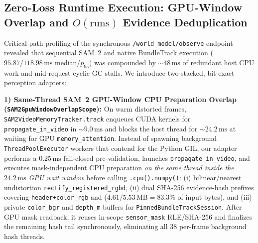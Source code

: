 \documentclass[10pt,journal]{IEEEtran}
\begin{document}
\subsection{Zero-Loss Runtime Execution: GPU-Window Overlap and $O(\text{runs})$ Evidence Deduplication}
\label{sec:runtime_opt}
Critical-path profiling of the synchronous \texttt{/world\_model/observe} endpoint revealed that sequential SAM~2 and native BundleTrack execution ($95.87/118.98\,\mathrm{ms}$ median/$p_{95}$) was compounded by $\sim 48\,\mathrm{ms}$ of redundant host CPU work and mid-request cyclic GC stalls. We introduce two stacked, bit-exact perception adapters:

\textbf{1) Same-Thread SAM~2 GPU-Window CPU Preparation Overlap (\texttt{SAM2GpuWindowOverlapScope}):} On warm distorted frames, \texttt{SAM2VideoMemoryTracker.track} enqueues CUDA kernels for \texttt{propagate\_in\_video} in $\sim 9.0\,\mathrm{ms}$ and blocks the host thread for $\sim 24.2\,\mathrm{ms}$ at  waiting for GPU \texttt{memory\_attention}. Instead of spawning background \texttt{ThreadPoolExecutor} workers that contend for the Python GIL, our adapter performs a $0.25\,\mathrm{ms}$ fail-closed pre-validation, launches \texttt{propagate\_in\_video}, and executes mask-independent CPU preparation \emph{on the same thread inside the $24.2\,\mathrm{ms}$ GPU wait window} before calling \texttt{.cpu().numpy()}: (i) bilinear/nearest undistortion \texttt{rectify\_registered\_rgbd}, (ii) dual SHA-256 evidence-hash prefixes covering \texttt{header+color\_rgb} and  ($4.61/5.53\,\mathrm{MB}=83.3\%$ of input bytes), and (iii) private \texttt{color\_bgr} and \texttt{depth\_m} buffers for \texttt{PinnedBundleTrackSession}. After GPU mask readback, it reuses in-scope \texttt{sensor\_mask} RLE/SHA-256 and finalizes the remaining hash tail synchronously, eliminating all $38$ per-frame background hash threads.
\end{document}
